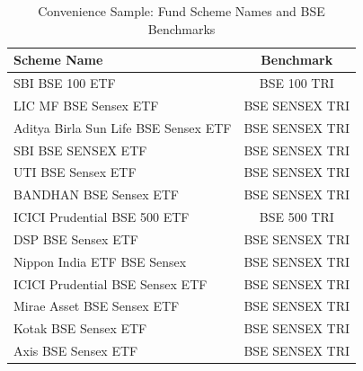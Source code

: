 \documentclass[conference]{IEEEtran}
\begin{document}
\begin{table}[t]
\caption{Convenience Sample: Fund Scheme Names and BSE Benchmarks}
\begin{center}
\footnotesize
\begin{tabular}{p{5.2cm}c}
\toprule
\textbf{Scheme Name} & \textbf{Benchmark} \\
\midrule
SBI BSE 100 ETF                       & BSE 100 TRI \\
LIC MF BSE Sensex ETF                 & BSE SENSEX TRI \\
Aditya Birla Sun Life BSE Sensex ETF  & BSE SENSEX TRI \\
SBI BSE SENSEX ETF                    & BSE SENSEX TRI \\
UTI BSE Sensex ETF                    & BSE SENSEX TRI \\
BANDHAN BSE Sensex ETF                & BSE SENSEX TRI \\
ICICI Prudential BSE 500 ETF          & BSE 500 TRI \\
DSP BSE Sensex ETF                    & BSE SENSEX TRI \\
Nippon India ETF BSE Sensex           & BSE SENSEX TRI \\
ICICI Prudential BSE Sensex ETF       & BSE SENSEX TRI \\
Mirae Asset BSE Sensex ETF            & BSE SENSEX TRI \\
Kotak BSE Sensex ETF                  & BSE SENSEX TRI \\
Axis BSE Sensex ETF                   & BSE SENSEX TRI \\
\bottomrule
\end{tabular}
\label{tab:funds}
\end{center}
\end{table}
\end{document}
